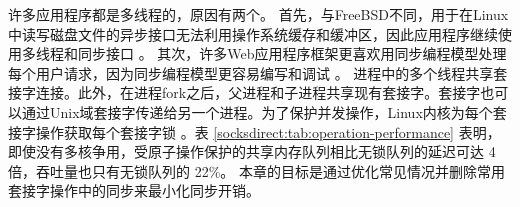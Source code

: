 许多应用程序都是多线程的，原因有两个。
首先，与FreeBSD不同，用于在Linux中读写磁盘文件的异步接口无法利用操作系统缓存和缓冲区，因此应用程序继续使用多线程和同步接口 \cite {nginx-multi-thread}。
其次，许多Web应用程序框架更喜欢用同步编程模型处理每个用户请求，因为同步编程模型更容易编写和调试 \cite {barroso2017attack}。
进程中的多个线程共享套接字连接。此外，在进程fork之后，父进程和子进程共享现有套接字。套接字也可以通过Unix域套接字传递给另一个进程。为了保护并发操作，Linux内核为每个套接字操作获取每个套接字锁 \cite {boyd2010analysis,han2012megapipe,lin2016scalable}。表 \ref {socksdirect:tab:operation-performance} 表明，即使没有多核争用，受原子操作保护的共享内存队列相比无锁队列的延迟可达 4 倍，吞吐量也只有无锁队列的 22\%。
本章的目标是通过优化常见情况并删除常用套接字操作中的同步来最小化同步开销。







